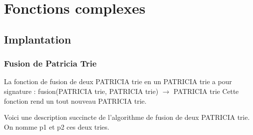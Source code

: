 \documentclass[a4paper,12pt]{report}
\begin{document}
\chapter{Fonctions complexes}
\section{Implantation}
\subsection{Fusion de Patricia Trie}

La fonction de fusion de deux PATRICIA trie en un PATRICIA trie a pour signature : fusion(PATRICIA trie, PATRICIA trie) $\rightarrow$ PATRICIA trie
Cette fonction rend un tout nouveau PATRICIA trie.

Voici une description succincte de l'algorithme de fusion de deux PATRICIA trie.
On nomme p1 et p2 ces deux tries.
\end{document}
